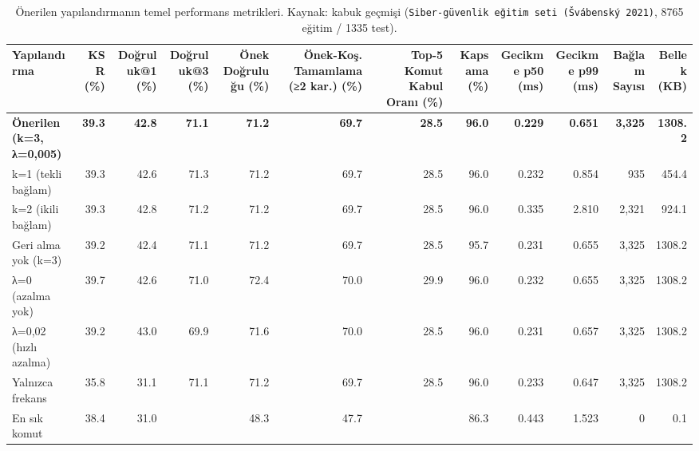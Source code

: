 \begin{table}[htbp]
  \centering
  \caption{Önerilen yapılandırmanın temel performans metrikleri. Kaynak: kabuk geçmişi (\texttt{Siber-güvenlik eğitim seti (Švábenský 2021)}, 8765 eğitim / 1335 test).}
  \label{tab:metrics_summary}
  \begin{tabular}{lrrrrrrrrrrr}
    \toprule
    Yapılandırma & KSR (\%) & Doğruluk@1 (\%) & Doğruluk@3 (\%) & Önek Doğruluğu (\%) & Önek-Koş. Tamamlama (≥2 kar.) (\%) & Top-5 Komut Kabul Oranı (\%) & Kapsama (\%) & Gecikme p50 (ms) & Gecikme p99 (ms) & Bağlam Sayısı & Bellek (KB) \\
    \midrule
    \textbf{Önerilen (k=3, λ=0,005)} & \textbf{39.3} & \textbf{42.8} & \textbf{71.1} & \textbf{71.2} & \textbf{69.7} & \textbf{28.5} & \textbf{96.0} & \textbf{0.229} & \textbf{0.651} & \textbf{3,325} & \textbf{1308.2} \\
    k=1 (tekli bağlam) & 39.3 & 42.6 & 71.3 & 71.2 & 69.7 & 28.5 & 96.0 & 0.232 & 0.854 & 935 & 454.4 \\
    k=2 (ikili bağlam) & 39.3 & 42.8 & 71.2 & 71.2 & 69.7 & 28.5 & 96.0 & 0.335 & 2.810 & 2,321 & 924.1 \\
    Geri alma yok (k=3) & 39.2 & 42.4 & 71.1 & 71.2 & 69.7 & 28.5 & 95.7 & 0.231 & 0.655 & 3,325 & 1308.2 \\
    λ=0 (azalma yok) & 39.7 & 42.6 & 71.0 & 72.4 & 70.0 & 29.9 & 96.0 & 0.232 & 0.655 & 3,325 & 1308.2 \\
    λ=0,02 (hızlı azalma) & 39.2 & 43.0 & 69.9 & 71.6 & 70.0 & 28.5 & 96.0 & 0.231 & 0.657 & 3,325 & 1308.2 \\
    Yalnızca frekans & 35.8 & 31.1 & 71.1 & 71.2 & 69.7 & 28.5 & 96.0 & 0.233 & 0.647 & 3,325 & 1308.2 \\
    En sık komut & 38.4 & 31.0 &  & 48.3 & 47.7 &  & 86.3 & 0.443 & 1.523 & 0 & 0.1 \\
    \bottomrule
  \end{tabular}
\end{table}
